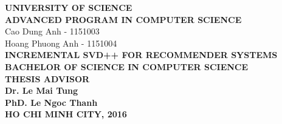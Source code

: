 \begin{titlepage}
{}

\begin{center}
{\selectfont
\textbf{\large UNIVERSITY OF SCIENCE \\[0.25cm]
ADVANCED PROGRAM IN COMPUTER SCIENCE}\\[1cm]

\textsf{\large Cao Dung Anh - 1151003 \\
Hoang Phuong Anh - 1151004
}\\[3cm]

\textbf{\color[rgb]{0.255, 0.412, 0.882} \Large 
INCREMENTAL SVD++ FOR RECOMMENDER SYSTEMS
}
}\\[2cm]
\textbf{ \large
BACHELOR OF SCIENCE IN COMPUTER SCIENCE\\[3cm]
}
\textbf{ \large
THESIS ADVISOR\\[0.25cm]
Dr. Le Mai Tung\\[0.25cm]
PhD. Le Ngoc Thanh
}\\[3.5cm]
\textbf{ \normalsize
HO CHI MINH CITY, 2016
}


\end{center}


\end{titlepage}